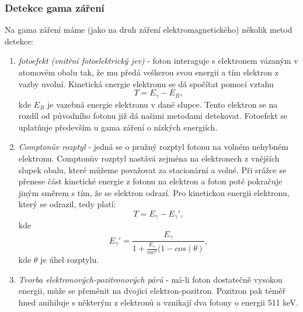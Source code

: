 \documentclass[english]{article}
\begin{document}
			\subsubsection{Detekce gama záření}
				Na gama záření máme (jako na druh záření elektromagnetického) několik metod detekce:
				
				\begin{enumerate}
					\item \emph{fotoefekt (vnitřní fotoelektrický jev)} - foton interaguje s elektronem vázaným v atomovém obalu tak, že mu předá veškerou svou energii a tím elektron z vazby uvolní. Kinetická energie elektronu se dá spočítat pomocí vztahu 
					\begin{equation}
						T = E_{\gamma} - E_B,
					\end{equation}
					kde $E_B$ je vazebná energie elektronu v dané slupce. Tento elektron se na rozdíl od původního fotonu již dá našimi metodami detekovat. Fotoefekt se uplatňuje především u gama záření o nízkých energiích. 
					
					\item \emph{Comptonův rozptyl} - jedná se o pružný rozptyl fotonu na volném nehybném elektronu. Comptonův rozptyl nastává zejména na elektronech z vnějších slupek obalu, které můžeme považovat za stacionární a volné. Při srážce se přenese část kinetické energie z fotonu na elektron a foton poté pokračuje jiným směrem s tím, že se elektron odrazí. Pro kinetickou energii elektronu, který se odrazil, tedy platí:
					\begin{equation}
						T = E_\gamma - E_\gamma',
					\end{equation}
					kde 
					\begin{equation}
						E_\gamma' = \frac{E_\gamma}{1+\frac{E_\gamma}{mc^2}(1-cos(\theta)},
					\end{equation}
					kde $\theta$ je úhel rozptylu.
					
					\item \emph{Tvorba elektronových-pozitronových párů} - má-li foton dostatečně vysokou energii, může se přeměnit na dvojici elektron-pozitron. Pozitron pak téměř hned anihiluje s některým z elektronů a vznikají dva fotony o energii 511 keV.
				\end{enumerate}
			
\end{document}
